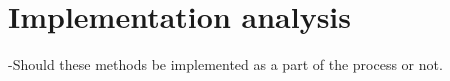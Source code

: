 \documentclass[12pt,a4paper,oneside,pdftex]{report}
\begin{document}
    \section{Implementation analysis}
    \label{sec:implementationanalysis}
    -Should these methods be implemented as a part of the process or not.











\end{document}
